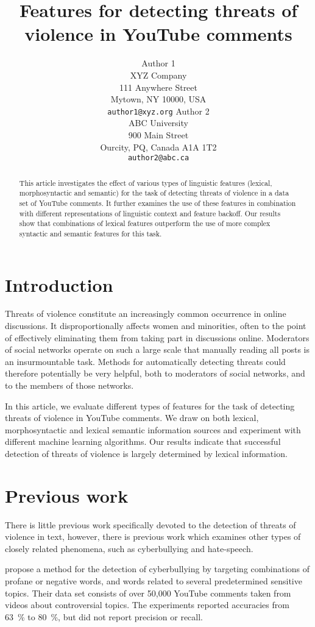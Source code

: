 \documentclass[11pt,letterpaper]{article}
\title{Features for detecting threats of violence in YouTube comments}
\author{Author 1\\
	    XYZ Company\\
	    111 Anywhere Street\\
	    Mytown, NY 10000, USA\\
	    {\tt author1@xyz.org}
	  \And
	Author 2\\
  	ABC University\\
  	900 Main Street\\
  	Ourcity, PQ, Canada A1A 1T2\\
  {\tt author2@abc.ca}}
\date{}
\begin{document}
\maketitle

\begin{abstract}
This article investigates the effect of various types of linguistic
features (lexical, morphosyntactic and semantic) for the task of
detecting threats of violence in a data set of YouTube comments. It
further examines the use of these features in combination with
different representations of linguistic context and feature backoff. Our results show that combinations of lexical features outperform the use of more complex syntactic and semantic features for this task.
\end{abstract}

\section{Introduction}
\label{sec:intro}
Threats of violence constitute an increasingly common occurrence in online
discussions. It disproportionally affects women and minorities, often
to the point of effectively eliminating them from taking part in
discussions online. Moderators of social networks operate on such a
large scale that manually reading all posts is an insurmountable
task. Methods for automatically detecting threats could therefore
potentially be very helpful, both to moderators of social networks,
and to the members of those networks.

In this article, we evaluate different types of features for the task
of detecting threats of violence in YouTube comments. We draw on both
lexical, morphosyntactic and lexical semantic information sources and
experiment with different machine learning algorithms. Our results
indicate that successful detection of threats of violence is largely
determined by lexical information.

\section{Previous work}
\label{sec:prev}
There is little previous work specifically devoted to the detection of
threats of violence in text, however, there is previous work which
examines other types of closely related phenomena, such as
cyberbullying and hate-speech.

 propose a method for the detection of
cyberbullying by targeting combinations of profane or negative words,
and words related to several predetermined sensitive topics. Their
data set consists of over 50,000 YouTube comments taken from videos
about controversial topics. %
The experiments reported accuracies from 63~\% to 80~\%, but did not
report precision or recall.
\end{document}

